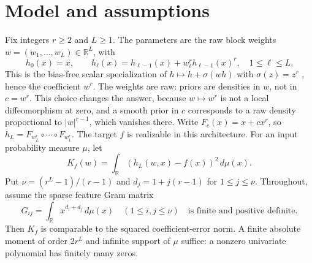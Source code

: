 \documentclass[11pt,letterpaper]{amsart}
\theoremstyle{scplain}
\newcommand{\R}{{\mathbb R}}
\begin{document}
\section{Model and assumptions}\label{sec:model}
Fix integers $r\ge2$ and $L\ge1$. The parameters are the raw block weights $w=(w_1,\ldots,w_L)\in\R^L$, with
\begin{equation}\label{eq:network}
 h_0(x)=x,\qquad h_\ell(x)=h_{\ell-1}(x)+w_\ell^r h_{\ell-1}(x)^r,
 \quad 1\le\ell\le L.
\end{equation}
This is the bias-free scalar specialization of $h\mapsto h+\sigma(wh)$ with $\sigma(z)=z^r$ \citep[Definition 2.1]{dahlgren2026}, hence the coefficient $w^r$. The weights are raw: priors are densities in $w$, not in $c=w^r$. This choice changes the answer, because $w\mapsto w^r$ is not a local diffeomorphism at zero, and a smooth prior in $c$ corresponds to a raw density proportional to $|w|^{r-1}$, which vanishes there. Write $F_c(x)=x+cx^r$, so $h_L=F_{w_L^r}\circ\cdots\circ F_{w_1^r}$. The target $f$ is realizable in this architecture. For an input probability measure $\mu$, let
\begin{equation}\label{eq:loss}
 K_f(w)=\int_\R (h_L(w,x)-f(x))^2\,d\mu(x).
\end{equation}
Put $\nu=(r^L-1)/(r-1)$ and $d_j=1+j(r-1)$ for $1\le j\le\nu$. Throughout, assume the sparse feature Gram matrix
\begin{equation}\label{eq:gram}
 G_{ij}=\int_\R x^{d_i+d_j}\,d\mu(x)
 \quad(1\le i,j\le\nu)
 \quad\text{is finite and positive definite.}
\end{equation}
Then $K_f$ is comparable to the squared coefficient-error norm. A finite absolute moment of order $2r^L$ and infinite support of $\mu$ suffice: a nonzero univariate polynomial has finitely many zeros.
\end{document}

